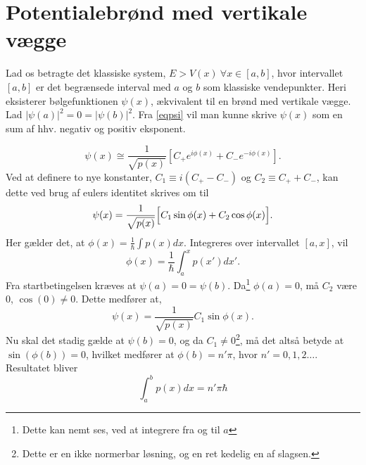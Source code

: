 \section{Potentialebrønd med vertikale vægge}
Lad os betragte det klassiske system, $E > V(x) \ \forall x \in[a,b]$, hvor intervallet $[a,b]$ er det begrænsede interval med $a$ og $b$ som klassiske vendepunkter. Heri eksisterer bølgefunktionen $\psi(x)$, ækvivalent til en brønd med vertikale vægge. Lad $|\psi(a)|^{2} = 0 = |\psi(b)|^{2}$. Fra \cref{eqpsi} vil man kunne skrive $\psi(x)$ som en sum af hhv. negativ og positiv eksponent.

\begin{equation}
    \psi(x) \cong \frac{1}{\sqrt{p(x)}}\left[C_{+}e^{i\phi(x)}+C_{-}e^{-i\phi(x)}\right].
  \label{eq:kvantiseringStart}
\end{equation}
Ved at definere to nye konstanter, $C_1 \equiv i(C_{+}-C_{-})$ og $C_2 \equiv C_{+}+C_{-}$, kan dette ved brug af eulers identitet skrives om til
\begin{equation}
  \psi(x) = \frac{1}{\sqrt{p(x)}}
  \Bigl[    C_1\sin{\phi(x)} + C_2\cos{\phi(x)}   \Bigr].
  \label{eq:kvantiseringSinCos}
\end{equation}
Her gælder det, at $\phi(x) = \frac{1}{\hbar}\int p(x) dx$. Integreres over intervallet $[a, x]$, vil
\begin{equation}
  \phi(x) = \frac{1}{\hbar}\int_{a}^{x} p(x')dx'.
\end{equation}
Fra startbetingelsen kræves at $\psi(a) = 0 = \psi(b)$. Da\footnote{Dette kan nemt ses, ved at integrere fra og til $a$} $\phi(a) = 0$, må $C_2$ være 0, $\cos(0)\neq 0$. Dette medfører at,
\begin{equation}
    \psi(x) = \frac{1}{\sqrt{p(x)}}C_1\sin{\phi(x)}.
\end{equation}
Nu skal det stadig gælde at $\psi(b) = 0$, og da $C_1\neq 0$\footnote{Dette er en ikke normerbar løsning, og en ret kedelig en af slagsen.}, må det altså betyde at $\sin(\phi(b)) = 0$, hvilket medfører at $\phi(b) = n'\pi$, hvor $n' = 0, 1, 2\ldots$.
Resultatet bliver
\begin{equation}
  \int_{a}^{b} p(x) dx = n'\pi\hbar
  \label{eq:kvantiDone}
\end{equation}
